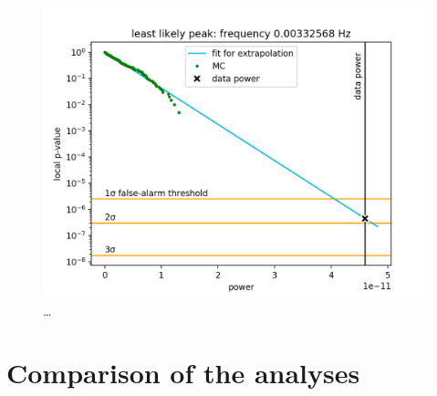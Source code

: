 \begin{figure}
  \centering
  \includegraphics[width=\linewidth]{gfx/axions/E0_best_signal_candidate.png}
  \caption{\ldots}
  \label{fig:E0_best_signal_candidate}
\end{figure}



\chapter{Comparison of the analyses}